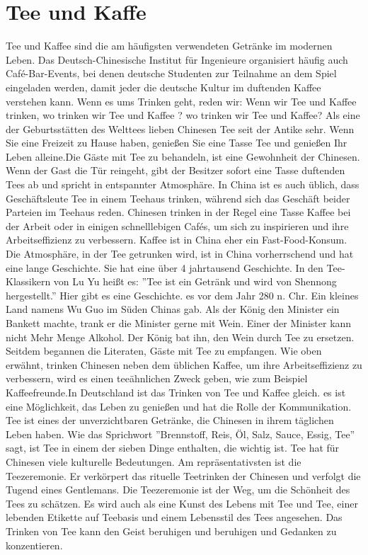 \section{Tee und Kaffe}
Tee und Kaffee sind die am häufigsten verwendeten Getränke im modernen Leben. Das Deutsch-Chinesische Institut für Ingenieure organisiert häufig auch Café-Bar-Events, bei denen deutsche Studenten zur Teilnahme an dem Spiel eingeladen werden, damit jeder die deutsche Kultur im duftenden Kaffee verstehen kann.
\mypar
Wenn es ums Trinken geht, reden wir: Wenn wir Tee und Kaffee trinken, wo trinken wir Tee und Kaffee ? wo trinken wir Tee und Kaffee? Als eine der Geburtsstätten des Welttees lieben Chinesen Tee seit der Antike sehr. Wenn Sie eine Freizeit zu Hause haben, genie\ss en Sie eine Tasse Tee und genie\ss en Ihr Leben alleine.Die Gäste mit Tee zu behandeln, ist eine Gewohnheit der Chinesen. Wenn der Gast die Tür reingeht, gibt der Besitzer sofort eine Tasse duftenden Tees ab und spricht in entspannter Atmosphäre. In China ist es auch üblich, dass Geschäftsleute Tee in einem Teehaus trinken, während sich das Geschäft beider Parteien im Teehaus reden.
\mypar
Chinesen trinken in der Regel eine Tasse Kaffee bei der Arbeit oder in einigen schnelllebigen Cafés, um sich zu inspirieren und ihre Arbeitseffizienz zu verbessern. Kaffee ist in China eher ein Fast-Food-Konsum. Die Atmosphäre, in der Tee getrunken wird, ist in China vorherrschend und hat eine lange Geschichte. Sie hat eine  über 4 jahrtausend Geschichte. In den Tee-Klassikern von Lu Yu hei\ss t es: ''Tee ist ein Getränk und wird von Shennong hergestellt.''
Hier gibt es eine Geschichte. es vor dem Jahr 280 n. Chr. Ein kleines Land namens Wu Guo im Süden Chinas gab. Als der König den Minister ein Bankett machte, trank er die Minister gerne mit Wein. Einer der Minister kann nicht Mehr Menge Alkohol. Der König bat ihn, den Wein durch Tee zu ersetzen. Seitdem begannen die Literaten, Gäste mit Tee zu empfangen. Wie oben erwähnt, trinken Chinesen neben dem üblichen Kaffee, um ihre Arbeitseffizienz zu verbessern, wird es einen teeähnlichen Zweck geben, wie zum Beispiel Kaffeefreunde.In Deutschland ist das Trinken von Tee und Kaffee gleich. es ist eine Möglichkeit, das Leben zu genie\ss en und hat die Rolle der Kommunikation.
\mypar
Tee ist eines der unverzichtbaren Getränke, die Chinesen in ihrem täglichen Leben haben. Wie das Sprichwort ''Brennstoff, Reis, Öl, Salz, Sauce, Essig, Tee'' sagt, ist Tee in einem der sieben Dinge enthalten, die wichtig ist. Tee hat für Chinesen viele kulturelle Bedeutungen. Am repräsentativsten ist die Teezeremonie. Er verkörpert das rituelle Teetrinken der Chinesen und verfolgt die Tugend eines Gentlemans. Die Teezeremonie ist der Weg, um die Schönheit des Tees zu schätzen. Es wird auch als eine Kunst des Lebens mit Tee und Tee, einer lebenden Etikette auf Teebasis und einem Lebensstil des Tees angesehen.  Das Trinken von Tee kann den Geist beruhigen und beruhigen und Gedanken zu konzentieren.
